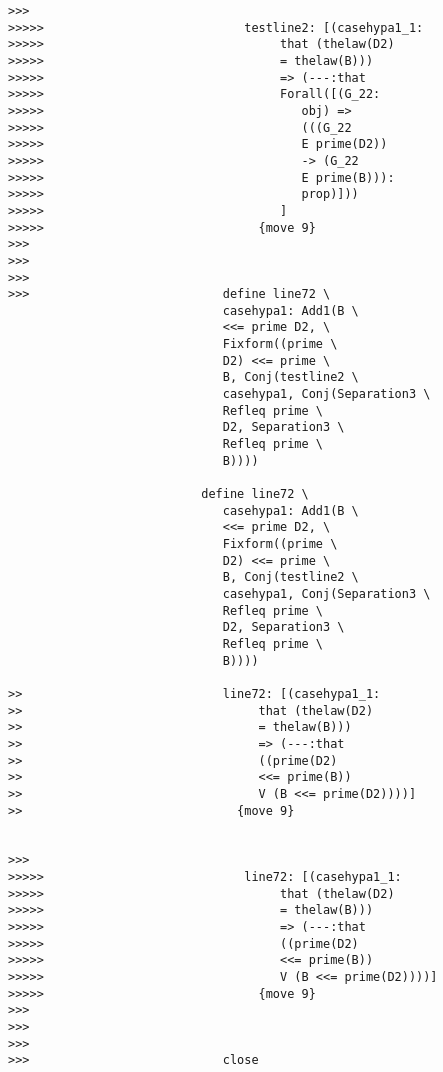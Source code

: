 \documentclass[12pt]{article}
\begin{document}
\begin{verbatim}
>>>
>>>>>                            testline2: [(casehypa1_1:
>>>>>                                 that (thelaw(D2)
>>>>>                                 = thelaw(B)))
>>>>>                                 => (---:that
>>>>>                                 Forall([(G_22:
>>>>>                                    obj) =>
>>>>>                                    (((G_22
>>>>>                                    E prime(D2))
>>>>>                                    -> (G_22
>>>>>                                    E prime(B))):
>>>>>                                    prop)]))
>>>>>                                 ]
>>>>>                              {move 9}
>>>
>>>
>>>
>>>                           define line72 \
                              casehypa1: Add1(B \
                              <<= prime D2, \
                              Fixform((prime \
                              D2) <<= prime \
                              B, Conj(testline2 \
                              casehypa1, Conj(Separation3 \
                              Refleq prime \
                              D2, Separation3 \
                              Refleq prime \
                              B))))

                           define line72 \
                              casehypa1: Add1(B \
                              <<= prime D2, \
                              Fixform((prime \
                              D2) <<= prime \
                              B, Conj(testline2 \
                              casehypa1, Conj(Separation3 \
                              Refleq prime \
                              D2, Separation3 \
                              Refleq prime \
                              B))))

>>                            line72: [(casehypa1_1:
>>                                 that (thelaw(D2)
>>                                 = thelaw(B)))
>>                                 => (---:that
>>                                 ((prime(D2)
>>                                 <<= prime(B))
>>                                 V (B <<= prime(D2))))]
>>                              {move 9}


>>>
>>>>>                            line72: [(casehypa1_1:
>>>>>                                 that (thelaw(D2)
>>>>>                                 = thelaw(B)))
>>>>>                                 => (---:that
>>>>>                                 ((prime(D2)
>>>>>                                 <<= prime(B))
>>>>>                                 V (B <<= prime(D2))))]
>>>>>                              {move 9}
>>>
>>>
>>>
>>>                           close


\end{verbatim}
\end{document}
